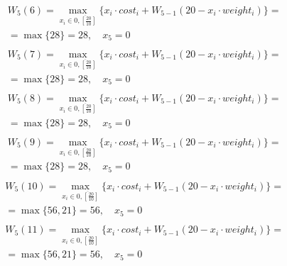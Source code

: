 \documentclass[17pt]{extarticle}
\begin{document}
\[
    \begin{aligned}
         & W_5(6)=\max_{x_i \in \overline{0, \left[\frac{20}{10}\right]}} \{x_i \cdot cost_i + W_{5-1}(20 - x_i \cdot weight_i)\}= \\& = \max \{
        28\}= 28, \quad x_5 = 0                                                                                                    \\
    \end{aligned}
\]
\[
    \begin{aligned}
         & W_5(7)=\max_{x_i \in \overline{0, \left[\frac{20}{10}\right]}} \{x_i \cdot cost_i + W_{5-1}(20 - x_i \cdot weight_i)\}= \\& = \max \{
        28\}= 28, \quad x_5 = 0                                                                                                    \\
    \end{aligned}
\]
\[
    \begin{aligned}
         & W_5(8)=\max_{x_i \in \overline{0, \left[\frac{20}{10}\right]}} \{x_i \cdot cost_i + W_{5-1}(20 - x_i \cdot weight_i)\}= \\& = \max \{
        28\}= 28, \quad x_5 = 0                                                                                                    \\
    \end{aligned}
\]
\[
    \begin{aligned}
         & W_5(9)=\max_{x_i \in \overline{0, \left[\frac{20}{10}\right]}} \{x_i \cdot cost_i + W_{5-1}(20 - x_i \cdot weight_i)\}= \\& = \max \{
        28\}= 28, \quad x_5 = 0                                                                                                    \\
    \end{aligned}
\]
\[
    \begin{aligned}
         & W_5(10)=\max_{x_i \in \overline{0, \left[\frac{20}{10}\right]}} \{x_i \cdot cost_i + W_{5-1}(20 - x_i \cdot weight_i)\}= \\& = \max \{
        56, 21\}= 56, \quad x_5 = 0                                                                                                 \\
    \end{aligned}
\]
\[
    \begin{aligned}
         & W_5(11)=\max_{x_i \in \overline{0, \left[\frac{20}{10}\right]}} \{x_i \cdot cost_i + W_{5-1}(20 - x_i \cdot weight_i)\}= \\& = \max \{
        56, 21\}= 56, \quad x_5 = 0                                                                                                 \\
    \end{aligned}
\]
\end{document}
